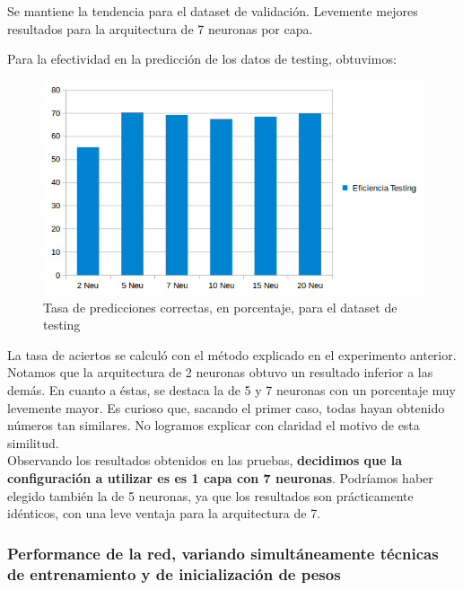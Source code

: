 \newpage

Se mantiene la tendencia para el dataset de validación. Levemente mejores resultados para la arquitectura de 7 neuronas por capa.

Para la efectividad en la predicción de los datos de testing, obtuvimos:\\

\begin{figure}[h]
  \begin{center}
  \includegraphics[scale=0.70]{graficos/ej2_cant_neuro_testing.png}
  \caption{Tasa de predicciones correctas, en porcentaje, para el dataset de testing}
  \end{center}
\end{figure}

La tasa de aciertos se calculó con el método explicado en el experimento anterior. Notamos que la arquitectura de 2 neuronas obtuvo un resultado inferior a las demás. En cuanto a éstas, se destaca la de 5 y 7 neuronas con un porcentaje muy levemente mayor. Es curioso que, sacando el primer caso, todas hayan obtenido números tan similares. No logramos explicar con claridad el motivo de esta similitud.\\

Observando los resultados obtenidos en las pruebas, \textbf{decidimos que la configuración a utilizar es es 1 capa con 7 neuronas}. Podríamos haber elegido también la de 5 neuronas, ya que los resultados son prácticamente idénticos, con una leve ventaja para la arquitectura de 7.\\

\subsubsection{Performance de la red, variando simultáneamente técnicas de entrenamiento y de inicialización de pesos}


